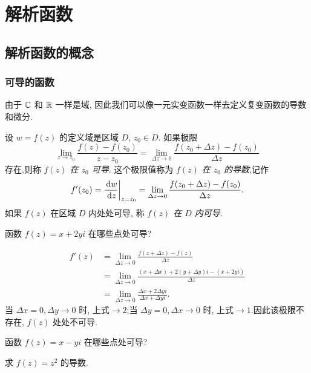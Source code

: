 
\chapter{解析函数}
\section{解析函数的概念}

\subsection{可导的函数}

由于 ${\mathbb{C}}$ 和 ${\mathbb{R}}$ 一样是域, 因此我们可以像一元实变函数一样去定义复变函数的导数和微分.

\begin{definition}[导数]
	设 $w=f(z)$ 的定义域是区域 $D$, $z_0\in D$.
	如果极限
		\[\lim_{z\to z_0}\frac{f(z)-f(z_0)}{z-z_0}
		=\lim_{\Delta z\to 0}\frac{f(z_0+\Delta z)-f(z_0)}{\Delta z}\]
	存在,则称 \emph{$f(z)$ 在 $z_0$ 可导}.
  这个极限值称为 \emph{$f(z)$ 在 $z_0$ 的导数},记作
		\[f'(z_0)=\frac{\,\mathrm{d} w}{\,\mathrm{d} z}\bigg|_{z=z_0}
		=\lim_{\Delta z\to 0}\frac{f(z_0+\Delta z)-f(z_0)}{\Delta z}.\]
	如果 $f(z)$ 在区域 $D$ 内处处可导, 称 \emph{$f(z)$ 在 $D$ 内可导}.
\end{definition}

\begin{example}
	函数 $f(z)=x+2yi$ 在哪些点处可导?
\end{example}

\begin{solution}
	\begin{align*}
		f'(z)&=\lim_{\Delta z\to 0}\frac{f(z+\Delta z)-f(z)}{\Delta z}\\
		&{=\lim_{\Delta z\to 0}\frac{(x+\Delta x)+2(y+\Delta y)i-(x+2yi)}{\Delta z}}\\
		&{=\lim_{\Delta z\to 0}\frac{\Delta x+2\Delta y i}{\Delta x+\Delta yi}.}
	\end{align*}
	当 $\Delta x=0, \Delta y\to 0$ 时, 上式$\to2$;当 $\Delta y=0, \Delta x\to 0$ 时, 上式$\to1$.因此该极限不存在, $f(z)$ 处处不可导.
\end{solution}

\begin{exercise}
  函数 $f(z)=x-yi$ 在哪些点处可导? 
\end{exercise}

\begin{example}
	求 $f(z)=z^2$ 的导数.
\end{example}

